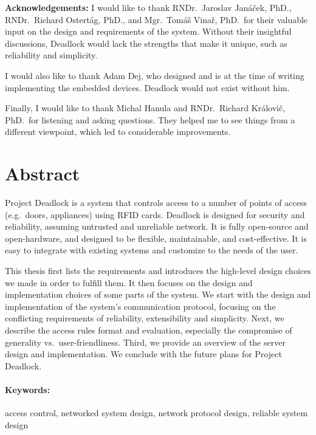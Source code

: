 \vfill
\noindent\textbf{Acknowledgements:} I would like to thank RNDr.~Jaroslav Janáček, PhD., RNDr.~Richard Ostertág, PhD., and Mgr.~Tomáš Vinař, PhD.~for their valuable input on the design and requirements of the system. Without their insightful discussions, Deadlock would lack the strengths that make it unique, such as reliability and simplicity.

I would also like to thank Adam Dej, who designed and is at the time of writing implementing the embedded devices. Deadlock would not exist without him.

Finally, I would like to thank Michal Hanula and RNDr.~Richard Královič, PhD.~for listening and asking questions. They helped me to see things from a different viewpoint, which led to considerable improvements.


\newpage
\section*{Abstract}

Project Deadlock is a system that controls access to a number of points of
access (e.g.~doors, appliances) using RFID cards. Deadlock is designed for
security and reliability, assuming untrusted and unreliable network. It is fully open-source and open-hardware, and designed  to be flexible, maintainable, and cost-effective. It is easy to integrate with existing systems and customize to the needs of the user.

This thesis first lists the requirements and introduces the high-level design choices we made in order to fulfill them.
It then focuses on the design and implementation choices of some parts of the system.
We start with the design and implementation of the system's communication protocol, focusing on the conflicting requirements of reliability, extensibility and simplicity.
Next, we describe the access rules format and evaluation, especially the compromise of generality vs.~user-friendliness.
Third, we provide an overview of the server design and implementation.
We conclude with the future plans for Project Deadlock.

\paragraph*{Keywords:} access control, networked system design, network protocol design, reliable system design

